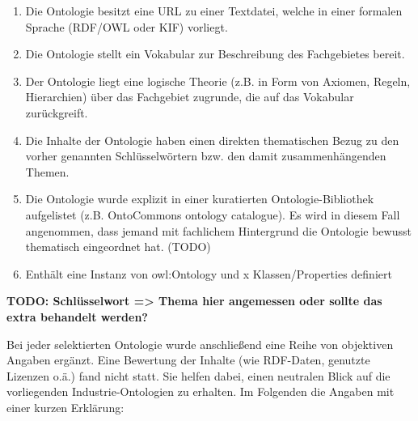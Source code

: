 \documentclass{article}
\begin{document}
\begin{enumerate}
    \item Die Ontologie besitzt eine URL zu einer Textdatei, welche in einer formalen Sprache (RDF/OWL oder KIF) vorliegt.
    \item Die Ontologie stellt ein Vokabular zur Beschreibung des Fachgebietes bereit.
    \item Der Ontologie liegt eine logische Theorie (z.B. in Form von Axiomen, Regeln, Hierarchien) über das Fachgebiet zugrunde, die auf das Vokabular zurückgreift.
    \item Die Inhalte der Ontologie haben einen direkten thematischen Bezug zu den vorher genannten Schlüsselwörtern bzw. den damit zusammenhängenden Themen.
    \item Die Ontologie wurde explizit in einer kuratierten Ontologie-Bibliothek aufgelistet (z.B. OntoCommons ontology catalogue). Es wird in diesem Fall angenommen, dass jemand mit fachlichem Hintergrund die Ontologie bewusst thematisch eingeordnet hat. (TODO)
    \item Enthält eine Instanz von owl:Ontology und x Klassen/Properties definiert
\end{enumerate}

\textbf{TODO: Schlüsselwort => Thema hier angemessen oder sollte das extra behandelt werden?}

Bei jeder selektierten Ontologie wurde anschließend eine Reihe von objektiven Angaben ergänzt.
Eine Bewertung der Inhalte (wie RDF-Daten, genutzte Lizenzen o.ä.) fand nicht statt.
Sie helfen dabei, einen neutralen Blick auf die vorliegenden Industrie-Ontologien zu erhalten.
Im Folgenden die Angaben mit einer kurzen Erklärung:
\end{document}
